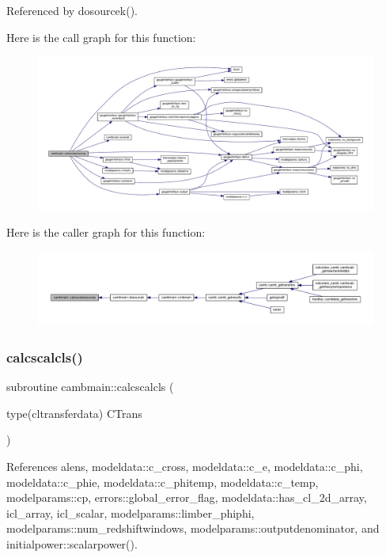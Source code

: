 Referenced by dosourcek().

Here is the call graph for this function\+:
\nopagebreak
\begin{figure}[H]
\begin{center}
\leavevmode
\includegraphics[width=350pt]{namespacecambmain_ab6fa8682eb65308c413e6501a9b5417c_cgraph}
\end{center}
\end{figure}
Here is the caller graph for this function\+:
\nopagebreak
\begin{figure}[H]
\begin{center}
\leavevmode
\includegraphics[width=350pt]{namespacecambmain_ab6fa8682eb65308c413e6501a9b5417c_icgraph}
\end{center}
\end{figure}
\mbox{\label{namespacecambmain_a8b2cc98e7553a77d720caca21f5ae8e5}} 
\subsubsection{\texorpdfstring{calcscalcls()}{calcscalcls()}}
{\footnotesize\ttfamily subroutine cambmain\+::calcscalcls (\begin{DoxyParamCaption}\item[{type(cltransferdata)}]{C\+Trans }\end{DoxyParamCaption})\hspace{0.3cm}{\ttfamily [private]}}



References alens, modeldata\+::c\+\_\+cross, modeldata\+::c\+\_\+e, modeldata\+::c\+\_\+phi, modeldata\+::c\+\_\+phie, modeldata\+::c\+\_\+phitemp, modeldata\+::c\+\_\+temp, modelparams\+::cp, errors\+::global\+\_\+error\+\_\+flag, modeldata\+::has\+\_\+cl\+\_\+2d\+\_\+array, icl\+\_\+array, icl\+\_\+scalar, modelparams\+::limber\+\_\+phiphi, modelparams\+::num\+\_\+redshiftwindows, modelparams\+::outputdenominator, and initialpower\+::scalarpower().



